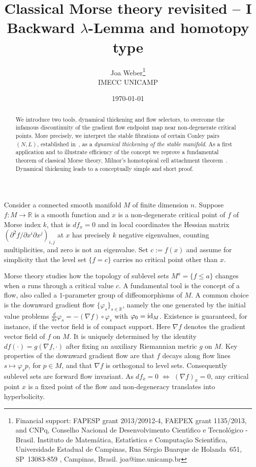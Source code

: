 \documentclass{article}
\title{Classical Morse theory revisited -- I \\
         Backward $\lambda$-Lemma and
         homotopy type
        }
\author{Joa Weber\footnote{
        Financial support:
        FAPESP grant 2013/20912-4,
        FAEPEX grant 1135/2013, and 
        CNPq, Conselho Nacional de Desenvolvimento Cient\'{\i}fico
        e Tecnol\'ogico - Brasil.
  Instituto de Matem\'{a}tica, Estat\'{\i}stica
  e Computa\c{c}\~{a}o Scient\'{\i}fica,
  Universidade Estadual de Campinas,
  Rua S\'{e}rgio Buarque de Holanda~651,
  SP~13083-859 ,
  Campinas, Brasil.
%
        \hfill
        joa@ime.unicamp.br
        }
        \\
        IMECC UNICAMP }
\date{\today}
\theoremstyle{definition}
\theoremstyle{remark}
\renewcommand{\1}{{{\mathchoice {\rm 1\mskip-4mu l} {\rm 1\mskip-4mu l}
{\rm 1\mskip-4.5mu l} {\rm 1\mskip-5mu l}}}}
\newcommand{\R}{{\mathbb{R}}}
\newcommand{\id}{{\rm id}}         %
\newcommand{\p}{{\partial}}
\begin{document}
\maketitle
\begin{abstract}
We introduce two tools, dynamical thickening and flow selectors,
to overcome the infamous discontinuity of the
gradient flow endpoint map near non-degenerate
critical points.
More precisely, we interpret the stable fibrations
of certain Conley pairs $(N,L)$, established
in~\cite{weber:2014c}, as a
\emph{dynamical thickening of the stable manifold}.
As a first application and to illustrate efficiency
of the concept we reprove a
fundamental theorem of classical Morse theory,
Milnor's homotopical cell attachment
theorem~\cite{milnor:1963a}.
Dynamical thickening leads to a
conceptually simple and short proof.
\end{abstract}%

%



Consider a connected smooth manifold
$M$ of finite dimension $n$. Suppose $f:M\to\R$
is a smooth function and $x$ is a non-degenerate
critical point of $f$ of Morse index $k$,
that is $df_x=0$ and
in local coordinates the Hessian matrix
$(\p^2 f/\p x^i\p x^j)_{i,j}$ at $x$ has precisely
$k$ negative eigenvalues, counting
multiplicities, and zero is not an eigenvalue.
Set $c:=f(x)$ and assume for simplicity
that the level set $\{f=c\}$ carries no
critical point other than $x$.

Morse theory studies how the topology
of sublevel sets $M^a=\{f\le a\}$ changes when
$a$ runs through a critical value $c$.
A fundamental tool is the concept of a flow,
also called a $1$-parameter group of
diffeomorphisms of $M$.
A common choice is the downward gradient
flow $\{\varphi_s\}_{s\in\R}$, namely the one
generated by the initial value problems
$\frac{d}{ds}\varphi_s=-(\nabla f)\circ\varphi_s$
with $\varphi_0=\id_M$. Existence is guaranteed,
for instance, if the vector field is of compact support.
Here $\nabla f$ denotes the gradient vector field
of $f$ on $M$. It is uniquely determined by
the identity $df(\cdot)=g(\nabla f,\cdot)$ after
fixing an auxiliary Riemannian metric $g$ on $M$.
Key properties of the downward gradient flow
are that $f$ decays along flow
lines $s\mapsto \varphi_s p$, for $p\in M$, and that
$\nabla f$ is orthogonal to level sets.
Consequently sublevel sets are forward
flow invariant. As $df_x=0$ $\Leftrightarrow$
$(\nabla f)_x=0$, any critical point $x$ is a
fixed point of the flow and non-degeneracy
translates into hyperbolicity.
\end{document}
